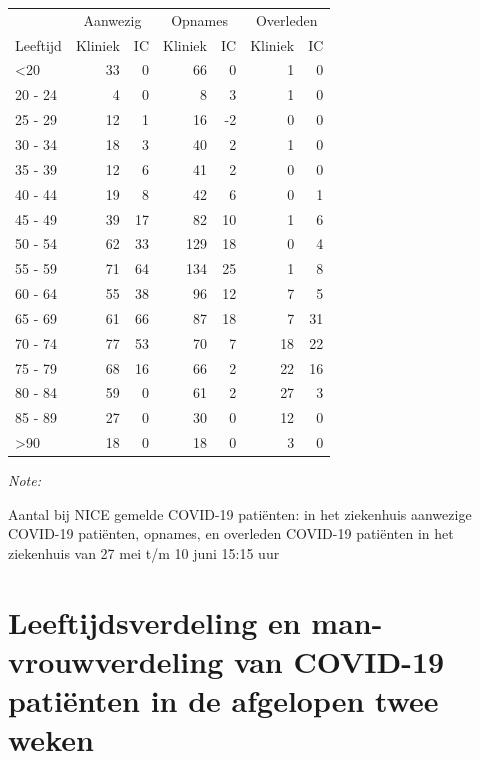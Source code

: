 \documentclass[
  english,
  man,floatsintext]{apa6}
\begin{document}
\begin{table}
\centering\begingroup\fontsize{10}{12}\selectfont

\begin{threeparttable}
\begin{tabular}{lrrrrrr}
\toprule
\multicolumn{1}{c}{ } & \multicolumn{2}{c}{Aanwezig} & \multicolumn{2}{c}{Opnames} & \multicolumn{2}{c}{Overleden} \\
\cmidrule(l{3pt}r{3pt}){2-3} \cmidrule(l{3pt}r{3pt}){4-5} \cmidrule(l{3pt}r{3pt}){6-7}
Leeftijd & Kliniek & IC & Kliniek & IC & Kliniek & IC\\
\midrule
<20 & 33 & 0 & 66 & 0 & 1 & 0\\
20 - 24 & 4 & 0 & 8 & 3 & 1 & 0\\
25 - 29 & 12 & 1 & 16 & -2 & 0 & 0\\
30 - 34 & 18 & 3 & 40 & 2 & 1 & 0\\
35 - 39 & 12 & 6 & 41 & 2 & 0 & 0\\
40 - 44 & 19 & 8 & 42 & 6 & 0 & 1\\
45 - 49 & 39 & 17 & 82 & 10 & 1 & 6\\
50 - 54 & 62 & 33 & 129 & 18 & 0 & 4\\
55 - 59 & 71 & 64 & 134 & 25 & 1 & 8\\
60 - 64 & 55 & 38 & 96 & 12 & 7 & 5\\
65 - 69 & 61 & 66 & 87 & 18 & 7 & 31\\
70 - 74 & 77 & 53 & 70 & 7 & 18 & 22\\
75 - 79 & 68 & 16 & 66 & 2 & 22 & 16\\
80 - 84 & 59 & 0 & 61 & 2 & 27 & 3\\
85 - 89 & 27 & 0 & 30 & 0 & 12 & 0\\
>90 & 18 & 0 & 18 & 0 & 3 & 0\\
\bottomrule
\end{tabular}
\begin{tablenotes}
\item \textit{Note: } 
\item Aantal bij NICE gemelde COVID-19 patiënten: in het ziekenhuis aanwezige COVID-19 patiënten, opnames, en overleden COVID-19 patiënten in het ziekenhuis van 27 mei t/m 10 juni 15:15 uur
\end{tablenotes}
\end{threeparttable}
\endgroup{}
\end{table}

\newpage

\hypertarget{leeftijdsverdeling-en-man-vrouwverdeling-van-covid-19-patiuxebnten-in-de-afgelopen-twee-weken}{%
\section{Leeftijdsverdeling en man-vrouwverdeling van COVID-19 patiënten in de afgelopen twee weken}\label{leeftijdsverdeling-en-man-vrouwverdeling-van-covid-19-patiuxebnten-in-de-afgelopen-twee-weken}}
\end{document}
